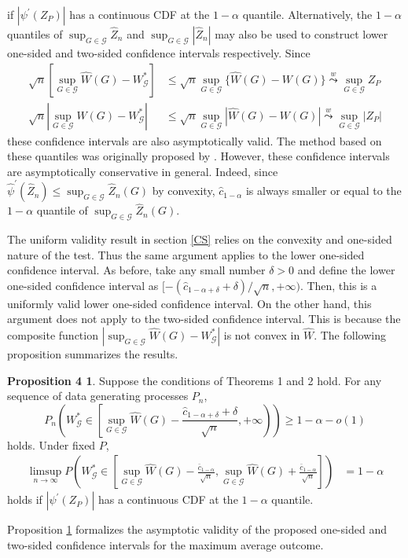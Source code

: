 \documentclass[12pt,oneside,reqno,english]{amsart}
\theoremstyle{definition}
\newtheorem*{prop1}{Proposition 4}
\begin{document}
if $|\psi^{\prime}(Z_{P})|$ has a continuous CDF at the $1-\alpha$ quantile.
Alternatively, the $1-\alpha$ quantiles of $\sup_{G\in \mathcal{G}}\hat{Z}_{n}$ and $\sup_{G\in \mathcal{G}}|\hat{Z}_{n}|$ may also be used 
to construct lower one-sided and two-sided confidence intervals respectively. Since 
\begin{align*}
\sqrt{n}\left[\sup_{G\in \mathcal{G}}\hat{W}(G)-W^{*}_{\mathcal{G}}\right]&\leq \sqrt{n}\sup_{G\in \mathcal{G}}\{\hat{W}(G)-W(G)\}\overset{w}{\underset{}{\leadsto}} \sup_{G\in \mathcal{G}}Z_{P}\\
\sqrt{n}\left|\sup_{G\in \mathcal{G}}\hat{W}(G)-W^{*}_{\mathcal{G}}\right|&\leq \sqrt{n}\sup_{G\in \mathcal{G}}|\hat{W}(G)-W(G)|\overset{w}{\underset{}{\leadsto}} \sup_{G\in \mathcal{G}}|Z_{P}|
\end{align*}
these confidence intervals are also asymptotically valid. The method based on these quantiles was originally proposed by \cite{KT:18}. 
However, these confidence intervals are asymptotically conservative in general. 
Indeed, since $\hat{\psi}^{\prime}(\hat{Z}_{n})\leq \sup_{G\in \mathcal{G}}\hat{Z}_{n}(G)$ by convexity, 
$\hat{c}_{1-\alpha}$ is always smaller or equal to the $1-\alpha$ quantile of  $\sup_{G\in \mathcal{G}}\hat{Z}_{n}(G)$.


The uniform validity result in section \ref{CS} relies on the convexity and one-sided nature of the test. 
Thus the same argument applies to the lower one-sided confidence interval. 
As before, take any small number $\delta>0$ and define the lower one-sided confidence interval as $[-(\hat{c}_{1-\alpha+\delta}+\delta)/\sqrt{n}, +\infty)$. Then, this is a uniformly valid lower one-sided confidence interval. 
On the other hand, this argument does not apply to the two-sided confidence interval. This is because 
the composite function $\left|\sup_{G\in \mathcal{G}}\hat{W}(G)-W^{*}_{\mathcal{G}}\right|$ is not convex in $\hat{W}$. 
The following proposition summarizes the results.
\begin{prop1}\label{prop} 
Suppose the conditions of Theorems 1 and 2 hold. 
For any sequence of data generating processes $P_{n}$,
\[P_{n}\left(W^{*}_{\mathcal{G}}\in \left[\sup_{G\in \mathcal{G}}\hat{W}(G)-\frac{\hat{c}_{1-\alpha+\delta}+\delta}{\sqrt{n}}, +\infty \right) \right)\geq 1-\alpha-o(1)\]
holds. Under fixed $P$, 
\begin{align*}
\limsup_{n\rightarrow \infty} P\left(W^{*}_{\mathcal{G}}\in \left[\sup_{G\in \mathcal{G}}\hat{W}(G)-\frac{\bar{c}_{1-\alpha}}{\sqrt{n}},\sup_{G\in \mathcal{G}}\hat{W}(G)+\frac{\bar{c}_{1-\alpha}}{\sqrt{n}}\right]\right)&=1-\alpha
\end{align*}
holds if $|\psi^{\prime}(Z_{P})|$ has a continuous CDF at the $1-\alpha$ quantile. 
\end{prop1}
Proposition \ref{prop} formalizes the asymptotic validity of the proposed one-sided and two-sided confidence intervals for the maximum average outcome.  
\end{document}
